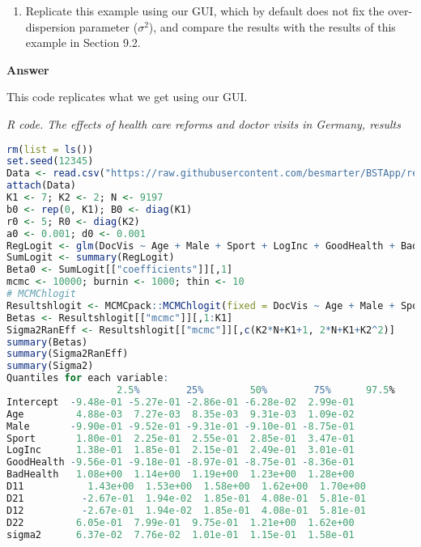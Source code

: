 \begin{enumerate}[leftmargin=*]
\begin{enumerate}
	\item Replicate this example using our GUI, which by default does not fix the over-dispersion parameter ($\sigma^2$), and compare the results with the results of this example in Section 9.2.
\end{enumerate}

\textbf{Answer}

This code replicates what we get using our GUI.

\begin{tcolorbox}[enhanced,width=4.67in,center upper,
	fontupper=\large\bfseries,drop shadow southwest,sharp corners]
	\textit{R code. The effects of health care reforms and doctor visits in Germany, results}
	\begin{VF}
		\begin{lstlisting}[language=R]
rm(list = ls())
set.seed(12345)
Data <- read.csv("https://raw.githubusercontent.com/besmarter/BSTApp/refs/heads/master/DataApp/9VisitDoc.csv", sep = ",", header = TRUE, quote = "")
attach(Data)
K1 <- 7; K2 <- 2; N <- 9197
b0 <- rep(0, K1); B0 <- diag(K1)
r0 <- 5; R0 <- diag(K2)
a0 <- 0.001; d0 <- 0.001
RegLogit <- glm(DocVis ~ Age + Male + Sport + LogInc + GoodHealth + BadHealth, family = binomial(link = "logit"))
SumLogit <- summary(RegLogit)
Beta0 <- SumLogit[["coefficients"]][,1]
mcmc <- 10000; burnin <- 1000; thin <- 10
# MCMChlogit
Resultshlogit <- MCMCpack::MCMChlogit(fixed = DocVis ~ Age + Male + Sport + LogInc + GoodHealth + BadHealth, random = ~Sozh, group="id", data = Data, burnin = burnin, mcmc = mcmc, thin = thin, mubeta = b0, Vbeta = B0, r = r0, R = R0, nu = a0, delta = d0, beta.start = Beta0, FixOD = 0)
Betas <- Resultshlogit[["mcmc"]][,1:K1]
Sigma2RanEff <- Resultshlogit[["mcmc"]][,c(K2*N+K1+1, 2*N+K1+K2^2)]
summary(Betas)
summary(Sigma2RanEff)
summary(Sigma2)
Quantiles for each variable:
				   2.5%        25%        50%        75%      97.5%
Intercept  -9.48e-01 -5.27e-01 -2.86e-01 -6.28e-02  2.99e-01
Age         4.88e-03  7.27e-03  8.35e-03  9.31e-03  1.09e-02
Male       -9.90e-01 -9.52e-01 -9.31e-01 -9.10e-01 -8.75e-01
Sport       1.80e-01  2.25e-01  2.55e-01  2.85e-01  3.47e-01
LogInc      1.38e-01  1.85e-01  2.15e-01  2.49e-01  3.01e-01
GoodHealth -9.56e-01 -9.18e-01 -8.97e-01 -8.75e-01 -8.36e-01
BadHealth   1.08e+00  1.14e+00  1.19e+00  1.23e+00  1.28e+00
D11		      1.43e+00  1.53e+00  1.58e+00  1.62e+00  1.70e+00
D21		     -2.67e-01  1.94e-02  1.85e-01  4.08e-01  5.81e-01
D12		     -2.67e-01  1.94e-02  1.85e-01  4.08e-01  5.81e-01
D22         6.05e-01  7.99e-01  9.75e-01  1.21e+00  1.62e+00
sigma2      6.37e-02  7.76e-02  1.01e-01  1.15e-01  1.58e-01
\end{lstlisting}
	\end{VF}
\end{tcolorbox}


\end{enumerate}
